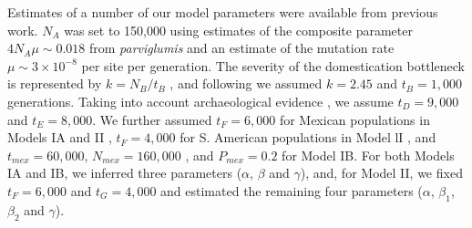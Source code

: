 Estimates of a number of our model parameters were available from previous work.    
$N_A$ was set to 150,000 using estimates of the composite parameter $4N_A\mu \sim 0.018$ from \emph{parviglumis}  \cite[]{Eyre-Walker_1998_9539756,Tenaillon_2001_11470895,Tenaillon_2004_15014173,Wright_2005_15919994,Ross-Ibarra_2009_19153259} and an estimate of the mutation rate $\mu \sim 3\times 10^{-8}$ \cite[]{Clark_2005_16079248} per site per generation.  
The severity of the domestication bottleneck is represented by $k=N_B/t_B$ \cite[]{Eyre-Walker_1998_9539756,Wright_2005_15919994}, and following \cite{Wright_2005_15919994} we assumed $k=2.45$ and $t_B=1,000$ generations.  
Taking into account archaeological evidence \cite[]{Piperno_2009_19307570}, we assume $t_D=9,000$ and $t_E=8,000$.  
We further assumed $t_F=6,000$ for Mexican populations in Models IA and II \cite[]{Piperno_2006_69}, $t_F=4,000$ for S. American populations in Model lI \cite[]{Perry_2006_16511492}, and $t_{mex}=60,000$, $N_{mex}=160,000$ \cite[]{Ross-Ibarra_2009_19153259}, and $P_{mex}=0.2$ \cite[]{vanHeerwaarden_2011_21189301} for Model IB. 
For both Models IA and IB, we inferred three parameters ($\alpha$, $\beta$ and $\gamma$), and, for Model II, we fixed $t_F=6,000$ and $t_G=4,000$ \cite[]{Piperno_2006_69,Perry_2006_16511492}  and estimated the remaining four parameters ($\alpha$, $\beta_1$, $\beta_2$ and $\gamma$).


